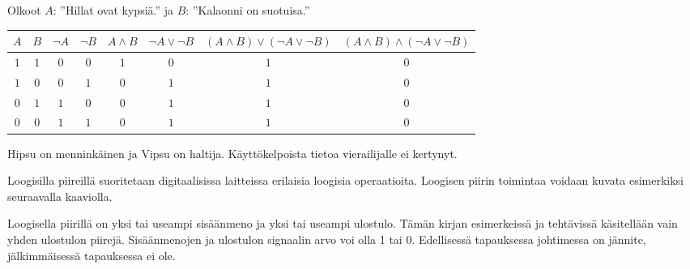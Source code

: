 \begin{tehtavasivu}
\begin{tehtava}
    \begin{vastaus}
    Olkoot $A$: ''Hillat ovat kypsiä.'' ja $B$: ''Kalaonni on suotuisa.''
    \begin{center}
		    \begin{tabular}{|c|c|c|c|c|c|c|c|}\hline
		    $A$ & $B$ & $\lnot A$ & $\lnot B$ & $A\land B$ & 
		         $\lnot A\lor \lnot B$ & $(A \land B)\lor(\lnot A\lor \lnot B)$ & $(A\land B)\land(\lnot A\lor \lnot B)$ \\ \hline
		    $1$ & $1$ & $0$ & $0$ & $1$ & $0$ & $1$ & $0$  \\ %
		    $1$ & $0$ & $0$ & $1$ & $0$ & $1$ & $1$ & $0$  \\
		    $0$ & $1$ & $1$ & $0$ & $0$ & $1$ & $1$ & $0$  \\
		    $0$ & $0$ & $1$ & $1$ & $0$ & $1$ & $1$ & $0$  \\ \hline
\end{tabular}
\end{center}
	Hipsu on menninkäinen ja Vipsu on haltija. Käyttökelpoista tietoa vierailijalle ei kertynyt. %
    \end{vastaus}
    
\end{tehtava}

        \newpage
        Loogisilla piireillä suoritetaan digitaalisissa laitteissa erilaisia loogisia operaatioita. Loogisen piirin toimintaa voidaan kuvata esimerkiksi seuraavalla kaaviolla.

        \medskip

        \begin{center}
        \end{center}

        \medskip

        Loogisella piirillä on yksi tai useampi sisäänmeno ja
        yksi tai useampi ulostulo. Tämän kirjan esimerkeissä ja
        tehtävissä käsitellään vain yhden ulostulon piirejä.
        Sisäänmenojen ja ulostulon signaalin arvo
        voi olla 1 tai 0. Edellisessä tapauksessa johtimessa on
        jännite, jälkimmäisessä tapauksessa ei ole.


\end{tehtavasivu}
